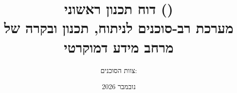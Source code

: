 \documentclass{pdr_hebrew}
\title{\textbf{דוח תכנון ראשוני (\en{Preliminary Design Report})} \\
\large מערכת רב-סוכנים לניתוח, תכנון ובקרה של מרחב מידע דמוקרטי}
\author{צוות הסוכנים: \en{master, theory, architect, simulator, redteam}}
\date{נובמבר 2026}
\begin{document}
\maketitle
\thispagestyle{empty}
\tableofcontents
\newpage


\newpage


\newpage


\newpage


\newpage

\begin{otherlanguage}{english}


\end{otherlanguage}
\end{document}
